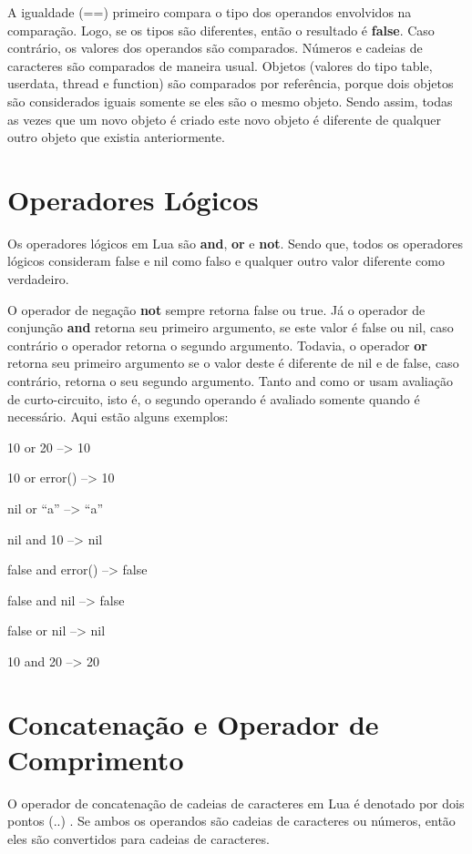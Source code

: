 \documentclass[
12pt, %
openright, %
oneside, %
a4paper, %
english, %
brazil, %
]{abntex2}
\begin{document}
A igualdade (==) primeiro compara o tipo dos operandos envolvidos na comparação. Logo, se os tipos são diferentes, então o resultado é \textbf{false}. Caso contrário, os valores dos operandos são comparados. Números e cadeias de caracteres são comparados de maneira usual. Objetos (valores do tipo table, userdata, thread e function) são comparados por referência, porque dois objetos são considerados iguais somente se eles são o mesmo objeto. Sendo assim, todas as vezes que um novo objeto é criado este novo objeto é diferente de qualquer outro objeto que existia anteriormente.

\section{Operadores Lógicos}
Os operadores lógicos em Lua são \textbf{and}, \textbf{or} e \textbf{not}. Sendo que, todos os operadores lógicos consideram false e nil como falso e qualquer outro valor diferente como verdadeiro.

O operador de negação \textbf{not} sempre retorna false ou true. Já o operador de conjunção \textbf{and} retorna seu primeiro argumento, se este valor é false ou nil, caso contrário o operador retorna o segundo argumento. Todavia, o operador \textbf{or} retorna seu primeiro argumento se o valor deste é diferente de nil e de false, caso contrário, retorna o seu segundo argumento. Tanto and como or usam avaliação de curto-circuito, isto é, o segundo operando é avaliado somente quando é necessário. Aqui estão alguns exemplos:

10 or 20            --> 10

10 or error()       --> 10

nil or ``a''        --> ``a''

nil and 10          --> nil

false and error()   --> false

false and nil       --> false

false or nil        --> nil

10 and 20           --> 20

\section{Concatenação e Operador de Comprimento}
O operador de concatenação de cadeias de caracteres em Lua é denotado por dois pontos (..) . Se ambos os operandos são cadeias de caracteres ou números, então eles são convertidos para cadeias de caracteres.
\end{document}
